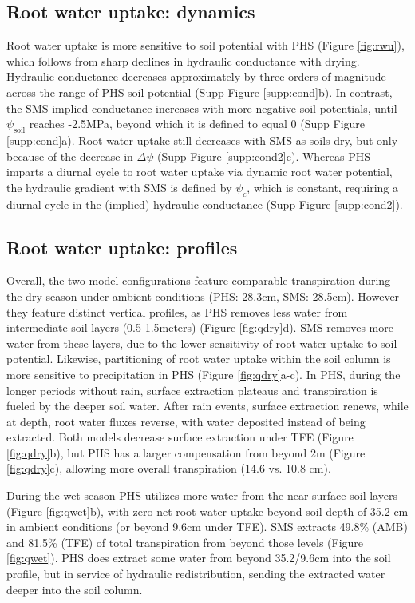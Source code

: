 \documentclass[draft,linenumbers]{agujournal}
\begin{document}
    
\subsection{Root water uptake: dynamics}
    Root water uptake is more sensitive to soil potential with PHS (Figure \ref{fig:rwu}),
    which follows from sharp declines in hydraulic conductance with drying.
    Hydraulic conductance decreases approximately by three orders of magnitude across the range of PHS soil potential (Supp Figure \ref{supp:cond}b).
    In contrast, the SMS-implied conductance increases with more negative soil potentials, until $\psi_{\text{soil}}$ reaches -2.5MPa, beyond which it is defined to equal 0 (Supp Figure \ref{supp:cond}a).
    Root water uptake still decreases with SMS as soils dry, but only because of the decrease in $\Delta\psi$ (Supp Figure \ref{supp:cond2}c).
    Whereas PHS imparts a diurnal cycle to root water uptake via dynamic root water potential, 
    the hydraulic gradient with SMS is defined by $\psi_c$, which is constant, requiring a diurnal cycle in the (implied) hydraulic conductance (Supp Figure \ref{supp:cond2}).
    
\subsection{Root water uptake: profiles}
    Overall, the two model configurations feature comparable transpiration during the dry season under ambient conditions (PHS: 28.3cm, SMS: 28.5cm).
    However they feature distinct vertical profiles, as PHS removes less water from intermediate soil layers (0.5-1.5meters) (Figure \ref{fig:qdry}d).
    SMS removes more water from these layers, due to the lower sensitivity of root water uptake to soil potential.
    Likewise, partitioning of root water uptake within the soil column is more sensitive to precipitation in PHS (Figure \ref{fig:qdry}a-c). In PHS, during the longer periods without rain, surface extraction plateaus and transpiration is fueled by the deeper soil water.
    After rain events, surface extraction renews, while at depth, root water fluxes reverse, with water deposited instead of being extracted.
    Both models decrease surface extraction under TFE (Figure \ref{fig:qdry}b), but PHS has a larger compensation from beyond 2m (Figure \ref{fig:qdry}c),
    allowing more overall transpiration (14.6 vs. 10.8 cm).
    
    During the wet season PHS utilizes more water from the near-surface soil layers (Figure \ref{fig:qwet}b), 
    with zero net root water uptake beyond soil depth of 35.2 cm in ambient conditions (or beyond 9.6cm under TFE).
    SMS extracts 49.8\% (AMB) and 81.5\% (TFE) of total transpiration from beyond those levels (Figure \ref{fig:qwet}). 
    PHS does extract some water from beyond 35.2/9.6cm into the soil profile, but in service of hydraulic redistribution, 
    sending the extracted water deeper into the soil column.
        
\end{document}
